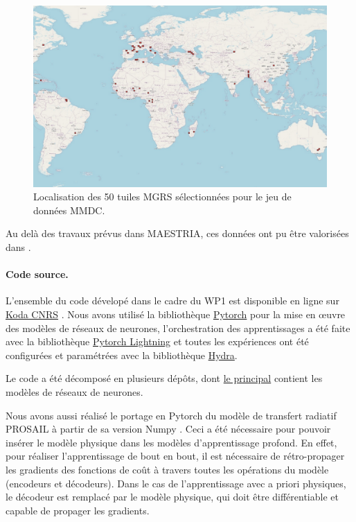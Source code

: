 \begin{figure}[htbp]
\begin{center}
\includegraphics[width=\columnwidth]{img/wp1/tiles.pdf}
\caption{Localisation des 50 tuiles MGRS sélectionnées pour le jeu de données MMDC.}
\label{fig:mmdctiles}
\end{center}
\end{figure}

Au delà des travaux prévus dans MAESTRIA, ces données ont pu être valorisées dans \citep{dumeur-2023-self-satel}.

\paragraph{Code source.}
L’ensemble du code dévelopé dans le cadre du WP1 est disponible en ligne sur \href{https://src.koda.cnrs.fr/mmdc}{Koda CNRS} . Nous avons utilisé la bibliothèque \href{https://pytorch.org/}{Pytorch} pour la mise en œuvre des modèles de réseaux de neurones, l’orchestration des apprentissages a été faite avec la bibliothèque \href{https://lightning.ai/}{Pytorch Lightning} et toutes les expériences ont été configurées et paramétrées avec la bibliothèque \href{https://hydra.cc/}{Hydra}.

Le code a été décomposé en plusieurs dépôts, dont \href{https://src.koda.cnrs.fr/mmdc/mmdc-singledate}{le principal} contient les modèles de réseaux de neurones.

Nous avons aussi réalisé le portage en Pytorch du modèle de transfert radiatif PROSAIL \cite{jacquemoud-2009-prosp-sail-model} à partir de sa version Numpy \cite{domenzain19}. Ceci a été nécessaire pour pouvoir insérer le modèle physique dans les modèles d’apprentissage profond. En effet, pour réaliser l’apprentissage de bout en bout, il est nécessaire de rétro-propager les gradients des fonctions de coût à travers toutes les opérations du modèle (encodeurs et décodeurs). Dans le cas de l’apprentissage avec a priori physiques, le décodeur est remplacé par le modèle physique, qui doit être différentiable et capable de propager les gradients.

